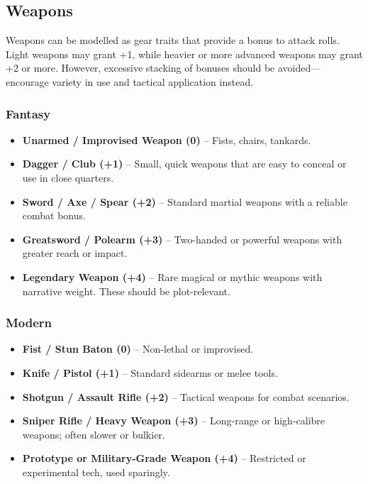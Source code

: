 \begin{multicols}{2}
\subsection{Weapons}

Weapons can be modelled as gear traits that provide a bonus to attack rolls. Light weapons may grant +1, while heavier or more advanced weapons may grant +2 or more. However, excessive stacking of bonuses should be avoided—encourage variety in use and tactical application instead.

\subsubsection*{Fantasy}

\begin{itemize}
  \item \textbf{Unarmed / Improvised Weapon (0)} – Fists, chairs, tankards.
  \item \textbf{Dagger / Club (+1)} – Small, quick weapons that are easy to conceal or use in close quarters.
  \item \textbf{Sword / Axe / Spear (+2)} – Standard martial weapons with a reliable combat bonus.
  \item \textbf{Greatsword / Polearm (+3)} – Two-handed or powerful weapons with greater reach or impact.
  \item \textbf{Legendary Weapon (+4)} – Rare magical or mythic weapons with narrative weight. These should be plot-relevant.
\end{itemize}

\subsubsection*{Modern}

\begin{itemize}
  \item \textbf{Fist / Stun Baton (0)} – Non-lethal or improvised.
  \item \textbf{Knife / Pistol (+1)} – Standard sidearms or melee tools.
  \item \textbf{Shotgun / Assault Rifle (+2)} – Tactical weapons for combat scenarios.
  \item \textbf{Sniper Rifle / Heavy Weapon (+3)} – Long-range or high-calibre weapons; often slower or bulkier.
  \item \textbf{Prototype or Military-Grade Weapon (+4)} – Restricted or experimental tech, used sparingly.
\end{itemize}


\end{multicols}
